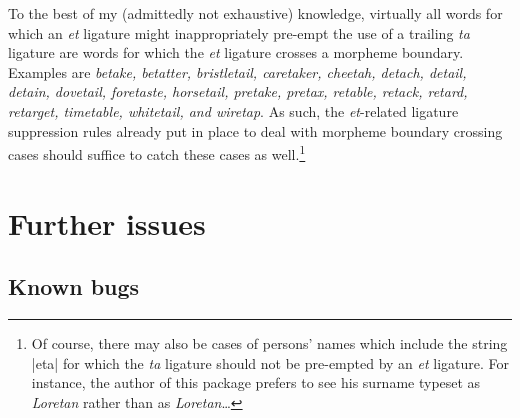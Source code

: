 \documentclass[11pt]{article}
\begin{document}
To the best of my (admittedly not exhaustive) knowledge, virtually all words for which an \emph{et} ligature might inappropriately pre-empt the use of a trailing \emph{ta} ligature are words for which the \emph{et} ligature crosses a morpheme boundary. Examples are \emph{betake, betatter, bristletail, caretaker, cheetah, detach, detail, detain, dovetail, foretaste, horsetail, pretake, pretax, retable, retack, retard, retarget, timetable, whitetail, \emph{and} wiretap}. As such, the \emph{et}-related ligature suppression rules already put in place to deal with morpheme boundary crossing cases should suffice to catch these cases as well.\footnote{Of course, there may also be cases of persons' names which include the string |eta| for which the \emph{ta} ligature should not be pre-empted by an \emph{et} ligature. For instance, the author of this package prefers to see his surname typeset as \emph{Loretan} rather than as \emph{Lor\mbox{et}an}\dots}




\section{Further issues}

\subsection{Known bugs}
\end{document}
